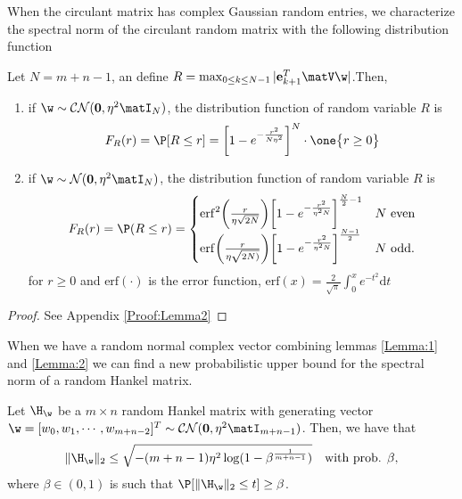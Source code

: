 	When the circulant matrix has complex Gaussian random entries, we characterize the spectral norm of the circulant random matrix with the following distribution function 

\begin{lemma}\label{Lemma:2}
	Let $N = m+n-1$, an define $R = \max_{0\leq k\leq N-1} |\mathbf{e}_{k+1}^T\matV\w|$.Then, 
	\begin{enumerate}
		\item if $\w\sim\mathcal{CN}(\mathbf{0},\eta^2\matI_{N})$, the distribution function of random variable $R$ is
		\begin{equation}
			F_R(r) = \P[R\leq r] = \bigg[1-e^{-\frac{r^2}{N\eta^2}}\bigg]^{N} \cdot\one\big\{r\geq 0\big\}
			\label{Eq:BoundCirculantMatrix2}
		\end{equation}		
		
		\item  if $\w\sim\mathcal{N}(\mathbf{0},\eta^2\matI_{N})$, the distribution function of random variable $R$ is
		\begin{equation}
			F_R(r) = \P(R\le r) = \begin{cases}\mathrm{erf}^2\bigg(\frac{r}{\eta\sqrt{2N}}\bigg)\bigg[1-e^{-\frac{r^2}{\eta^2 N}}\bigg]^{\frac{N}{2}-1} & \text{$N$ even}\\[0.3em]
				\mathrm{erf}\bigg(\frac{r}{\eta\sqrt{2N)}}\bigg)\bigg[1-e^{-\frac{r^2}{\eta^2N}}\bigg]^{\frac{N-1}{2}} & \text{$N$ odd.}
			\end{cases}
			\label{Eq:DistributionRealVector}
		\end{equation}
		for $r\ge 0$ and $\mathrm{erf}(\cdot)$ is the error function, $\mathrm{erf}(x) = \frac{2}{\sqrt{\pi}}\int_0^xe^{-t^2}\mathrm{d}t $
	\end{enumerate}						     
\end{lemma}
\begin{proof}
	See Appendix \ref{Proof:Lemma2}
\end{proof}

 When we have a random normal complex vector combining lemmas \ref{Lemma:1} and \ref{Lemma:2} we can find a new probabilistic upper bound for the spectral norm of a random Hankel matrix.

\begin{theorem}\label{Th:boundHankelMatrix2}
	Let $\H_{\w}$ be a $m\times n$ random Hankel matrix with generating vector $\w = [w_0, w_1,\cdots,w_{m+n-2}]^T\sim\mathcal{CN}(\mathbf{0},\eta^2\matI_{m+n-1})$. Then, we have that
	\begin{equation}
		\|\H_{\w}\|_2 \leq \sqrt{-(m+n-1)\eta^2\log(1-\beta^{\frac{1}{m+n-1}})} \quad \text{with prob. $\beta$,}
		\label{Eq:BoundHankelMatrix2}
	\end{equation}
	where $\beta\in(0,1)$ is such that $\P[\|\H_{\w}\|_2\le t]\ge\beta$.
\end{theorem}				

